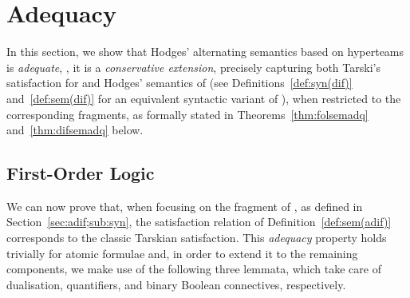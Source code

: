 \documentclass[authoryear]{elsarticle}
\begin{document}



\section{Adequacy}
\label{sec:adq}

In this section, we show that Hodges' alternating semantics based on hyperteams
is \emph{adequate}, \ie, it is a \emph{conservative extension}, precisely
capturing both Tarski's satisfaction for \FOL and Hodges' semantics of \IF (see
Definitions~\ref{def:syn(dif)} and~\ref{def:sem(dif)} for an equivalent
syntactic variant of \IF), when restricted to the corresponding fragments, as
formally stated in Theorems~\ref{thm:folsemadq} and~\ref{thm:difsemadq} below.




\subsection{First-Order Logic}
\label{sec:adq;sub:fol}

We can now prove that, when focusing on the \FOL fragment of \ADIF, as defined
in Section~\ref{sec:adif;sub:syn}, the satisfaction relation of
Definition~\ref{def:sem(adif)} corresponds to the classic Tarskian satisfaction.
This \emph{\FOL adequacy} property holds trivially for atomic formulae and, in
order to extend it to the remaining \FOL components, we make use of the
following three lemmata, which take care of dualisation, quantifiers, and binary
Boolean connectives, respectively.
\end{document}
